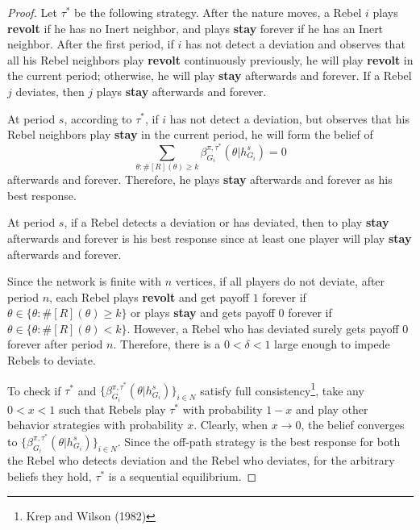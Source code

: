 \documentclass[12pt,letter]{article}
\newtheorem*{lemma*}{Lemma}
\theoremstyle{definition}
\theoremstyle{remark}
\theoremstyle{claim}
\begin{document}
\begin{proof}
Let $\tau^{*}$ be the following strategy. After the nature moves, a Rebel $i$ plays \textbf{revolt} if he has no Inert neighbor, and plays \textbf{stay} forever if he has an Inert neighbor. After the first period, if $i$ has not detect a deviation and observes that all his Rebel neighbors play \textbf{revolt} continuously previously, he will play \textbf{revolt} in the current period; otherwise, he will play \textbf{stay} afterwards and forever. If a Rebel $j$ deviates, then $j$ plays \textbf{stay} afterwards and forever.

At period $s$, according to $\tau^{*}$, if $i$ has not detect a deviation, but observes that his Rebel neighbors play \textbf{stay} in the current period, he will form the belief of \[\sum_{\theta:\#[R](\theta)\geq k}\beta^{\pi,\tau^*}_{G_i}(\theta|h^{s}_{G_i})=0\] afterwards and forever. Therefore, he plays \textbf{stay} afterwards and forever as his best response. 

At period $s$, if a Rebel detects a deviation or has deviated, then to play \textbf{stay} afterwards and forever is his best response since at least one player will play \textbf{stay} afterwards and forever. 

Since the network is finite with $n$ vertices, if all players do not deviate, after period $n$, each Rebel plays \textbf{revolt} and get payoff $1$ forever if $\theta\in \{\theta: \#[R](\theta)\geq k\}$ or plays \textbf{stay} and gets payoff $0$ forever if $\theta\in \{\theta: \#[R](\theta)< k\}$. However, a Rebel who has deviated surely gets payoff $0$ forever after period $n$. Therefore, there is a $0<\delta<1$ large enough to impede Rebels to deviate.

To check if $\tau^{*}$ and $\{\beta^{\pi,\tau^*}_{G_i}(\theta|h^{s}_{G_i})\}_{i\in N}$ satisfy full consistency\footnote{Krep and Wilson (1982)}, take any $0<x<1$ such that Rebels play $\tau^{*}$ with probability $1-x$ and play other behavior strategies with probability $x$. Clearly, when $x \rightarrow 0$, the belief converges to $\{\beta^{\pi,\tau^*}_{G_i}(\theta|h^{s}_{G_i})\}_{i\in N}$. Since the off-path strategy is the best response for both the Rebel who detects deviation and the Rebel who deviates, for the arbitrary beliefs they hold, $\tau^{*}$ is a sequential equilibrium.
\end{proof}
%
%
\end{document}
